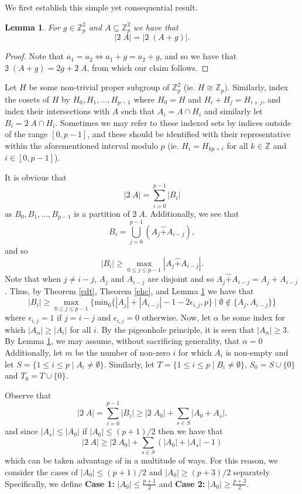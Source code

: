 \documentclass[a4paper, 12pt]{article}\usepackage[english]{babel}
\newtheorem{lem}[thm]{Lemma}
\newcommand{\Z}{\mathbb{Z}}
\newcommand{\<}{\langle}
\begin{document}
We first establish this simple yet consequential result.

\begin{lem}\label{translation}
For $g\in \Z_p^2$ and $A\subseteq \Z_p^2$ we have that
    \[|2\hat{\;}A|=|2\hat{\;}(A+g)|.\]
\end{lem}
\begin{proof}
    Note that $a_1=a_2\iff a_1+g=a_2+g$, and so we have that $2\hat{\;}(A+g)=2g+2\hat{\;}A$, from which our claim follows.
\end{proof}
Let $H$ be some non-trivial proper subgroup of $\Z_p^2$ (ie. $H\cong\Z_p$). Similarly, index the cosets of $H$ by $H_0,H_1,\dots,H_{p-1}$ where $H_0=H$ and $H_{i}+H_{j}=H_{i+j}$, and index their intersections with $A$ such that $A_i=A\cap H_i$ and similarly let $B_i=2\hat{\;}A\cap H_i$. Sometimes we may refer to these indexed sets by indices outside of the range $[0,p-1]$, and these should be identified with their representative within the aforementioned interval modulo $p$ (ie. $H_i=H_{kp+i}$ for all $k\in\Z$ and $i\in [0,p-1]$).

It is obvious that \[|2\hat{\;}A|=\sum_{i=0}^{p-1}|B_i|\] as $B_0,B_1,\dots,B_{p-1}$ is a partition of $2\hat{\;}A$. Additionally, we see that \[B_i=\bigcup_{j=0}^{p-1}(A_{j}\hat{+}A_{i-j}),\] and so \[|B_i|\geq\max_{0\leq j\leq p-1}|A_{j}\hat{+}A_{i-j}|.\] 
Note that when $j\neq i-j$, $A_j$ and $A_{i-j}$ are disjoint and so $A_{j}\hat{+}A_{i-j}=A_{j}+A_{i-j}$. Thus, by Theorem \ref{cdt}, Theorem \ref{ehc}, and Lemma \ref{translation}  we have that \begin{equation}\label{CosetLBMain}
    |B_i|\geq \max_{0\leq j\leq p-1}\{\mathrm{min}_0\{|A_j|+|A_{i-j}|-1-2\epsilon_{i,j},p\}\mid \emptyset\not\in \{A_j,A_{i-j} \}\}
\end{equation}
where $\epsilon_{i,j}=1$ if $j=i-j$ and $\epsilon_{i,j}=0$ otherwise.
Now, let $\alpha$ be some index for which $|A_\alpha|\geq |A_i|$ for all $i$.  By the pigeonhole principle, it is seen that $|A_\alpha|\geq 3$. By Lemma \ref{translation}, we may assume, without sacrificing generality, that $\alpha=0$ Additionally, let $m$ be the number of non-zero $i$ for which $A_i$ is non-empty and let $S=\{1\leq i\leq p\mid A_i\neq \emptyset\}.$  Similarly, let $T=\{1\leq i\leq p\mid B_i\neq \emptyset\}$, $S_0=S\cup\{0\}$ and $T_0=T\cup\{0\}$.


Observe that 
\begin{equation}\label{basiclb}
    |2\hat{\;}A|=\sum_{i=0}^{p-1}|B_i|\geq |2\hat{\;}A_0|+\sum_{s\in S}|A_0+A_s|.
\end{equation}
and since $|A_s|\leq |A_0|$ if $|A_0|\leq (p+1)/2$ then we have that \[ |2\hat{\;}A|\geq |2\hat{\;}A_0|+\sum_{s\in S}(|A_0|+|A_s|-1)\] which can be taken advantage of in a multitude of ways. For this reason, we consider the cases of $|A_0|\leq (p+1)/2$ and $|A_0|\geq (p+3)/2$ separately Specifically, we define \textbf{Case 1:} $|A_0|\leq \frac{p+1}{2}$ and  \textbf{Case 2:} $|A_0|\geq \frac{p+3}{2}$.
\end{document}
